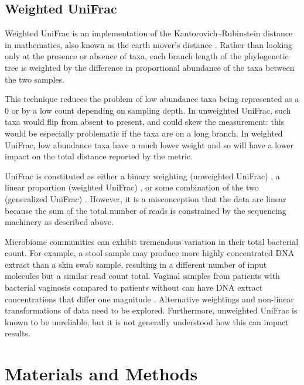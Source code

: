 \documentclass[10pt,letterpaper]{article}
\begin{document}
\FloatBarrier

\subsection{Weighted UniFrac}
Weighted UniFrac \cite{lozupone2007quantitative} is an implementation of the Kantorovich–Rubinstein distance in mathematics, also known as the earth mover’s distance \cite{evans2012phylogenetic}. Rather than looking only at the presence or absence of taxa, each branch length of the phylogenetic tree is weighted by the difference in proportional abundance of the taxa between the two samples.

This technique reduces the problem of low abundance taxa being represented as a 0 or by a low count depending on sampling depth. In unweighted UniFrac, such taxa would flip from absent to present, and could skew the measurement: this would be especially problematic if the taxa are on a long branch. In weighted UniFrac, low abundance taxa have a much lower weight and so will have a lower impact on the total distance reported by the metric.

UniFrac is constituted as either a binary weighting (unweighted UniFrac) \cite{lozupone2005unifrac}, a linear proportion (weighted UniFrac) \cite{lozupone2007quantitative}, or some combination of the two (generalized UniFrac) \cite{chen2012associating}. However, it is a misconception that the data are linear because the sum of the total number of reads is constrained by the sequencing machinery \cite{friedman2012inferring} \cite{fernandes2013anova} \cite{fernandes2014unifying} \cite{lovell2015proportionality} as described above.

Microbiome communities can exhibit tremendous variation in their total bacterial count. For example, a stool sample may produce more highly concentrated DNA extract than a skin swab sample, resulting in a different number of input molecules but a similar read count total. Vaginal samples from patients with bacterial vaginosis compared to patients without can have DNA extract concentrations that differ one magnitude \cite{zozaya2010quantitative}. Alternative weightings and non-linear transformations of data need to be explored. Furthermore, unweighted UniFrac is known to be unreliable, but it is not generally understood how this can impact results.

\section*{Materials and Methods}
\end{document}
